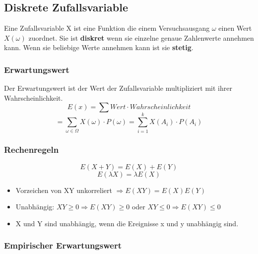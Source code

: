 \documentclass[margin=normal]{tex/hsrzf}
\begin{document}
\subsection{Diskrete Zufallsvariable}
\begin{multicols}{2}

    \noindent Eine Zufallsvariable X ist eine Funktion die einem
    Versuchsausgang $\omega$ einen Wert $X(\omega)$ zuordnet.
    Sie ist \textbf{diskret} wenn sie einzelne genaue Zahlenwerte annehmen kann.
    Wenn sie beliebige Werte annehmen kann ist sie \textbf{stetig}.

    \subsubsection*{Erwartungswert}
    Der Erwartungswert ist der Wert der Zufallsvariable multipliziert mit ihrer Wahrscheinlichkeit.
    $$E(x) = \sum Wert \cdot Wahrscheinlichkeit$$
    $$ =\sum _{\omega \in \Omega} X(\omega) \cdot P({\omega}) = \sum _{i=1} ^{k} X(A_i) \cdot P(A_i)$$

    \subsubsection*{Rechenregeln}
    $$E(X+Y) = E(X) + E(Y)$$
    $$E(\lambda X) = \lambda E(X)$$

    \begin{itemize}
        \item Vorzeichen von XY unkorreliert \newline $\Rightarrow E(XY) = E(X)E(Y)$
        \item Unabhängig: $XY \geq 0 \Rightarrow E(XY) \geq 0$ \newline oder $XY\leq 0 \Rightarrow E(XY) \leq 0$
        \item X und Y sind unabhängig, wenn die Ereignisse x und y unabhängig sind.
    \end{itemize}
    \subsubsection*{Empirischer Erwartungswert}


\end{multicols}
\end{document}

